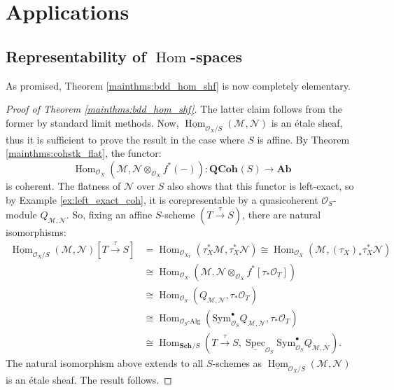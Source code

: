\documentclass{amsart}
\theoremstyle{plain}
\theoremstyle{definition}
\theoremstyle{remark}
\numberwithin{equation}{section}
\newcommand{\Orb}{\mathcal{O}}
\DeclareMathOperator{\spec}{Spec}
\newcommand{\QCOHB}{\mathbf{QCoh}}
\newcommand{\QCOH}[2][]{\QCOHB^{#1}({#2})}
\newcommand{\Homstk}{\underline{\Hom}}
\DeclareMathOperator{\Hom}{Hom}
\newcommand{\tensor}{\otimes}
\newcommand{\AB}{\mathbf{Ab}}
\newcommand{\Sch}{\mathbf{Sch}}
\newcommand{\SCH}[2][]{\Sch^{#1}/{#2}}
\newcommand{\shv}[1]{\mathcal{{#1}}}
\begin{document}
\section{Applications}
\subsection{Representability of $\Hom$-spaces}\label{sec:cohobc} 
As promised, Theorem \ref{mainthms:bdd_hom_shf} is now completely 
elementary. 
\begin{proof}[Proof of Theorem \ref{mainthms:bdd_hom_shf}]
  The latter claim follows from the former by standard limit methods.
  Now, $\Homstk_{\Orb_X/S}(\shv{M},\shv{N})$ is an \'etale sheaf,
  thus it is sufficient to prove the result in the case where $S$ is
  affine. By Theorem \ref{mainthms:cohstk_flat}, the functor:
  \[
  \Hom_{\Orb_X}(\shv{M},\shv{N}\tensor_{\Orb_X}{f}^*(-)) : \QCOH{S} \to \AB
  \]
  is coherent. The flatness of
  $\shv{N}$ over $S$ also shows that this functor is left-exact, so by
  Example \ref{ex:left_exact_coh}, it is corepresentable by a
  quasicoherent $\Orb_S$-module $Q_{\shv{M},\shv{N}}$. So, fixing an
  affine $S$-scheme $(T 
  \xrightarrow{\tau} S)$, there are natural  
  isomorphisms: 
  \begin{align*}
    \Homstk_{\Orb_X/S}(\shv{M},\shv{N})[T\xrightarrow{\tau} S] &=
    \Hom_{\Orb_{X_T}}(\tau_X^*\shv{M},\tau_X^*\shv{N}) \cong
    \Hom_{\Orb_X}(\shv{M},(\tau_X)_*\tau_X^*\shv{N})\\ 
    &\cong \Hom_{\Orb_X}(\shv{M},\shv{N}\tensor_{\Orb_X}
    {f}^*[\tau_*\Orb_T]) \\
    &\cong \Hom_{\Orb_S}(Q_{\shv{M},\shv{N}},\tau_*\Orb_T)\\
    &\cong
    \Hom_{\Orb_S\text{-}\mathrm{Alg}}(\mathrm{Sym}^\bullet_{\Orb_S}
    Q_{\shv{M},\shv{N}},\tau_*\Orb_T)\\
    &\cong \Hom_{\SCH{S}}(T\xrightarrow{\tau} S,\underline{\spec}_{\Orb_S}
    \mathrm{Sym}^\bullet_{\Orb_S} Q_{\shv{M},\shv{N}}).
  \end{align*}
  The natural isomorphism above extends to all $S$-schemes as
  $\Homstk_{\Orb_X/S}(\shv{M},\shv{N})$ is an \'etale sheaf. The
  result follows.  
\end{proof}
\end{document}
